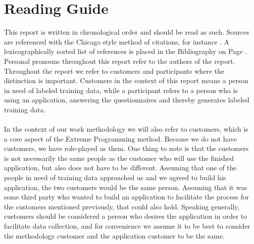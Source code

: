 
\section*{Reading Guide}

This report is written in chronological order and should be read as such. Sources are referenced with the Chicago style method of citations, for instance \parencite{android_adb}. A lexicographically sorted list of references is placed in the Bibliography on Page \pageref{bibliografi}. Personal pronouns throughout this report refer to the authors of the report. Throughout the report we refer to customers and participants where the distinction is important. Customers in the context of this report means a person in need of labeled training data, while a participant refers to a person who is using an application, answering the questionnaires and thereby generates labeled training data. 
\\\\
In the context of our work methodology we will also refer to customers, which is a core aspect of the Extreme Programming method. Because we do not have customers, we have role-played as them. One thing to note is that the customers is not necessarily the same people as the customer who will use the finished application, but also does not have to be different. Assuming that one of the people in need of training data approached us and we agreed to build his application, the two customers would be the same person. Assuming that it was some third party who wanted to build an application to facilitate the process for the customers mentioned previously, that could also hold. Speaking generally, customers should be considered a person who desires the application in order to facilitate data collection, and for convenience we assume it to be best to consider the methodology customer and the application customer to be the same. 
